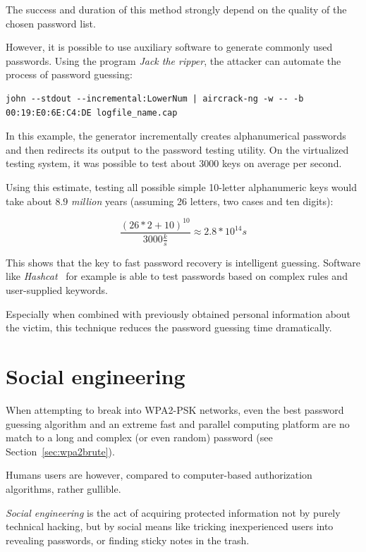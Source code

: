 The success and duration of this method strongly depend on the quality of the chosen password list.

However, it is possible to use auxiliary software to generate commonly used passwords. Using the program \emph{Jack the ripper}, the attacker can automate the process of password guessing:

\begin{lstlisting}
john --stdout --incremental:LowerNum | aircrack-ng -w -- -b 00:19:E0:6E:C4:DE logfile_name.cap
\end{lstlisting}

In this example, the generator incrementally creates alphanumerical passwords and then redirects its output to the password testing utility. On the virtualized testing system, it was possible to test about 3000 keys on average per second.

Using this estimate, testing all possible simple 10-letter alphanumeric keys would take about \(8.9\) \emph{million} years (assuming 26 letters, two cases and ten digits):

\begin{displaymath}
\frac{(26 * 2 + 10)^{10}}{3000\frac{k}{s}}\approx2.8*10^{14} s
\end{displaymath}

This shows that the key to fast password recovery is intelligent guessing. Software like \emph{Hashcat}~\cite{Steube17} for example is able to test passwords based on complex rules and user-supplied keywords.

Especially when combined with previously obtained personal information about the victim, this technique reduces the password guessing time dramatically.

\section{Social engineering}\label{sec:attackuser}

When attempting to break into WPA2-PSK networks, even the best password guessing algorithm and an extreme fast and parallel computing platform are no match to a long and complex (or even random) password (see Section~\ref{sec:wpa2brute}).

Humans users are however, compared to computer-based authorization algorithms, rather gullible. 

\emph{Social engineering} is the act of acquiring protected information not by purely technical hacking, but by social means like tricking inexperienced users into revealing passwords, or finding sticky notes in the trash.

